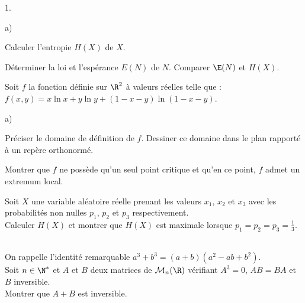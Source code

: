 \documentclass[11pt]{article}%
\begin{document}
\begin{exerciceAP}
\begin{noliste}{1.}
    \begin{noliste}{a)}
    \setlength{\itemsep}{2mm}
    \item Calculer l'entropie $H(X)$ de $X$.
    \item Déterminer la loi et l'espérance $E (N)$ de $N$. Comparer
      $\E(N)$ et $H(X)$.
    \end{noliste}

  \item Soit $f$ la fonction définie sur $\R^2$ à valeurs réelles
    telle que : $f(x,y) = x \ln x + y \ln y + (1-x-y) \ln
    (1-x-y)$. 
    \begin{noliste}{a)}
    \setlength{\itemsep}{2mm}
    \item Préciser le domaine de définition de $f$. Dessiner ce
      domaine dans le plan rapporté à un repère orthonormé.
    \item Montrer que $f$ ne possède qu'un seul point critique et
      qu'en ce point, $f$ admet un extremum local.
    \item Soit $X$ une variable aléatoire réelle prenant les valeurs
      $x_1$, $x_2$ et $x_3$ avec les probabilités non nulles $p_1$,
      $p_2$ et $p_3$ respectivement.\\

      Calculer $H(X)$ et montrer que $H(X)$ est maximale lorsque
      $p_1=p_2=p_3 = \frac{1}{3}$.
    \end{noliste}   
  \end{noliste}
\end{exerciceAP}


\begin{exerciceSP}~\\
  On rappelle l'identité remarquable $a^3 + b^3 = (a+b) (a^2 - a b +
  b^2)$.\\
  Soit $n \in \N^*$ et $A$ et $B$ deux matrices de $\mathcal{M}_n ( \R
  )$ vérifiant $A^3 = 0$, $A B = B A$ et $B$ inversible. \\
  Montrer que $A + B$ est inversible.
\end{exerciceSP}


\newpage


\end{document}
